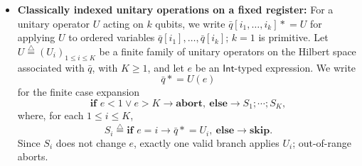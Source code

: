 \documentclass[acmsmall,screen,review,anonymous,nonacm]{acmart}
\theoremstyle{defn_style}
\newcommand{\asteq}{\mathrel{*}=}
\begin{document}
\begin{itemize}
    For a bit-valued input view \(a\), a bit-valued basis view \(b\), and a
    quantum view \(\bar q\), define basis-indexed preparation
    \[
    \mathsf{PrepBits}^{E}_{b}(a;\bar q)
    \]
    as syntax sugar for
    \[
    \mathbf{for}^{E}\ i=1\ \mathbf{to}\ E
    \quad
    \mathbf{if}\ b[i]=0
    \rightarrow S_0(i),
    \quad
    \mathbf{else}
    \rightarrow S_1(i)
    \quad
    \mathbf{end},
    \]
    where
    \[
    S_0(i)
    \stackrel{\triangle}{=}
    \mathbf{if}\ a[i]=0
    \rightarrow
    \bar q[i]:=\ket0,
    \quad
    \mathbf{else}
    \rightarrow
    \bar q[i]:=\ket1,
    \]
    and
    \[
    S_1(i)
    \stackrel{\triangle}{=}
    \mathbf{if}\ a[i]=0
    \rightarrow
    \bar q[i]:=\ket+,
    \quad
    \mathbf{else}
    \rightarrow
    \bar q[i]:=\ket- .
    \]

    Omitting the basis subscript means computational-basis preparation:
    \[
    \mathsf{PrepBits}^{E}(a;\bar q)
    \stackrel{\triangle}{=}
    \mathsf{PrepBits}^{E}_{\mathbf 0_E}(a;\bar q),
    \]
    where
    \[
    \mathbf 0_E[i]=0
    \qquad
    (1\le i\le E).
    \]

    Thus
    \[
    \mathsf{PrepBits}^{E}(a;\bar q)
    \]
    expands to
    \[
    \mathbf{for}^{E}\ i=1\ \mathbf{to}\ E
    \quad
    \mathbf{if}\ a[i]=0
    \rightarrow
    \bar q[i]:=\ket0,
    \quad
    \mathbf{else}
    \rightarrow
    \bar q[i]:=\ket1
    \quad
    \mathbf{end}.
    \]

    Both forms are descriptor-preserving register operations. Their output
    quantum state is determined by the displayed classical controls and not by
    the previous state of \(\bar q[i]\).

    \item \textbf{Classically indexed unitary operations on a fixed register:}
    For a unitary operator \(U\) acting on \(k\) qubits, we write
    \(\bar q[i_1,\ldots,i_k]\asteq U\)
    for applying \(U\) to ordered variables
    \(\bar q[i_1],\ldots,\bar q[i_k]\); \(k=1\) is primitive.
    Let \(U\stackrel{\triangle}{=}(U_i)_{1\le i\le K}\) be a finite family
    of unitary operators on the Hilbert space associated with \(\bar q\),
    with \(K\ge 1\), and let \(e\) be an \(\mathsf{Int}\)-typed expression.
    We write
    \[
    \bar q\asteq U(e)
    \]
    for the finite case expansion
    \[
    \textbf{if } e<1\lor e>K \rightarrow \textbf{abort},
    \ \textbf{else}\rightarrow S_1;\cdots;S_K,
    \]
    where, for each \(1\le i\le K\),
    \[
    S_i
    \stackrel{\triangle}{=}
    \textbf{if } e=i \rightarrow \bar q\asteq U_i,
    \ \textbf{else}\rightarrow\mathbf{skip}.
    \]
    Since \(S_i\) does not change \(e\), exactly one valid branch applies
    \(U_i\); out-of-range aborts.


\end{itemize}
\end{document}
